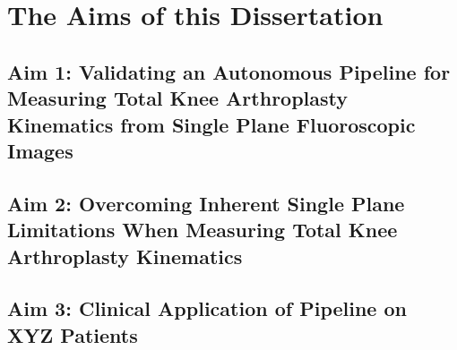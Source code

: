 \chapter{The Aims of this Dissertation}
\label{sec:aims}

\section{Aim 1: Validating an Autonomous Pipeline for Measuring Total Knee Arthroplasty Kinematics from Single Plane Fluoroscopic Images}
\label{sec:aim1}


\section{Aim 2: Overcoming Inherent Single Plane Limitations When Measuring Total Knee Arthroplasty Kinematics}
\label{sec:aim2}


\section{Aim 3: Clinical Application of Pipeline on XYZ Patients}
\label{sec:aim3}


